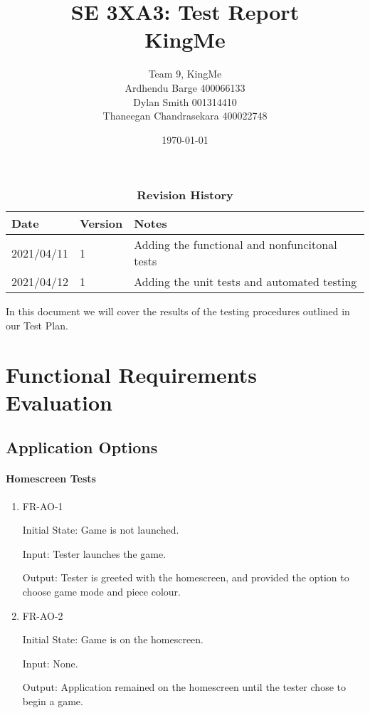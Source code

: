 \documentclass[12pt, titlepage]{article}
\title{SE 3XA3: Test Report\\KingMe}
\author{Team 9, KingMe
		\\ Ardhendu Barge 400066133
		\\ Dylan Smith 001314410
		\\ Thaneegan Chandrasekara 400022748
}
\date{\today}
\begin{document}
\maketitle

\tableofcontents
\listoftables
\listoffigures

\begin{table}[bp]
\caption{\bf Revision History}
\begin{tabularx}{\textwidth}{p{3cm}p{2cm}X}
\toprule {\bf Date} & {\bf Version} & {\bf Notes}\\
\midrule
2021/04/11 & 1 & Adding the functional and nonfuncitonal tests\\
2021/04/12 & 1 & Adding the unit tests and automated testing\\
\bottomrule
\end{tabularx}
\end{table}

\newpage


In this document we will cover the results of the testing procedures outlined in our Test Plan.

\section{Functional Requirements Evaluation}

\subsection{Application Options}

\paragraph{Homescreen Tests}
\begin{enumerate}
    \item{FR-AO-1}
    
    Initial State: Game is not launched.
    
    Input: Tester launches the game.
    
    Output: Tester is greeted with the homescreen, and provided the option to choose game mode and piece colour.
    \item{FR-AO-2}
        
    Initial State: Game is on the homescreen.
    
    Input: None.
    
    Output: Application remained on the homescreen until the tester chose to begin a game.
\end{enumerate}
\end{document}
